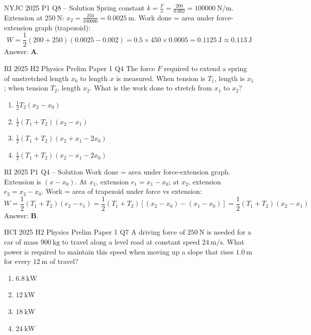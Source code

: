 \documentclass[11pt]{beamer}
\begin{document}
\begin{frame}{NYJC 2025 P1 Q8 – Solution}
Spring constant $k = \frac{F}{x} = \frac{200}{0.002} = 100000\ \mathrm{N/m}$.
Extension at $250\ \mathrm{N}$: $x_2 = \frac{250}{100000} = 0.0025\ \mathrm{m}$.
Work done = area under force-extension graph (trapezoid):
\[ W = \frac12 (200 + 250)(0.0025 - 0.002) = 0.5\times450\times0.0005 = 0.1125\ \mathrm{J} \approx 0.113\ \mathrm{J} \]
Answer: \textbf{A}.
\end{frame}

\begin{frame}[shrink=15]{RI 2025 H2 Physics Prelim Paper 1 Q4}
The force $F$ required to extend a spring of unstretched length $x_0$ to length $x$ is measured. When tension is $T_1$, length is $x_1$; when tension $T_2$, length $x_2$. What is the work done to stretch from $x_1$ to $x_2$?
\begin{enumerate}[A]
    \item $\frac12 T_2(x_2 - x_0)$
    \item $\frac12 (T_1 + T_2)(x_2 - x_1)$
    \item $\frac12 (T_1 + T_2)(x_2 + x_1 - 2x_0)$
    \item $\frac12 (T_1 + T_2)(x_2 - x_1 - 2x_0)$
\end{enumerate}
\end{frame}

\begin{frame}{RI 2025 P1 Q4 – Solution}
Work done = area under force-extension graph. Extension is $(x - x_0)$. At $x_1$, extension $e_1 = x_1 - x_0$; at $x_2$, extension $e_2 = x_2 - x_0$.
Work = area of trapezoid under force vs extension:
\[ W = \frac12 (T_1 + T_2)(e_2 - e_1) = \frac12 (T_1 + T_2)[(x_2 - x_0) - (x_1 - x_0)] = \frac12 (T_1 + T_2)(x_2 - x_1) \]
Answer: \textbf{B}.
\end{frame}

\begin{frame}[shrink=15]{HCI 2025 H2 Physics Prelim Paper 1 Q7}
A driving force of $250\ \mathrm{N}$ is needed for a car of mass $900\ \mathrm{kg}$ to travel along a level road at constant speed $24\ \mathrm{m/s}$. What power is required to maintain this speed when moving up a slope that rises $1.0\ \mathrm{m}$ for every $12\ \mathrm{m}$ of travel?
\begin{enumerate}[A]
    \item $6.8\ \mathrm{kW}$
    \item $12\ \mathrm{kW}$
    \item $18\ \mathrm{kW}$
    \item $24\ \mathrm{kW}$
\end{enumerate}
\end{frame}
\end{document}
